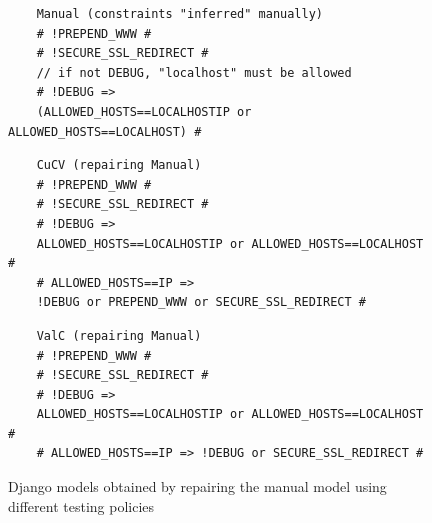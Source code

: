 \begin{tikzborder}{\cite{Gargantini16:validation}}
\begin{tikzborder}{\cite{gargantini_combinatorial_2017}}
\begin{tikzborder}{\cite{gargantini_combinatorial_2017}}
\begin{figure}[h]

	\vspace{-3mm}
	\begin{lstlisting}
	Manual (constraints "inferred" manually)
	# !PREPEND_WWW #
	# !SECURE_SSL_REDIRECT #
	// if not DEBUG, "localhost" must be allowed
	# !DEBUG => 
	(ALLOWED_HOSTS==LOCALHOSTIP or ALLOWED_HOSTS==LOCALHOST) #
	\end{lstlisting}
	\vspace{-3mm}\begin{lstlisting}
	CuCV (repairing Manual)
	# !PREPEND_WWW #
	# !SECURE_SSL_REDIRECT #
	# !DEBUG => 
	ALLOWED_HOSTS==LOCALHOSTIP or ALLOWED_HOSTS==LOCALHOST #
	# ALLOWED_HOSTS==IP => 
	!DEBUG or PREPEND_WWW or SECURE_SSL_REDIRECT #
	\end{lstlisting}
	\vspace{-3mm}\begin{lstlisting}
	ValC (repairing Manual)
	# !PREPEND_WWW #
	# !SECURE_SSL_REDIRECT #
	# !DEBUG => 
	ALLOWED_HOSTS==LOCALHOSTIP or ALLOWED_HOSTS==LOCALHOST #
	# ALLOWED_HOSTS==IP => !DEBUG or SECURE_SSL_REDIRECT #
	\end{lstlisting}
	\caption{Django models obtained by repairing the manual model using different testing policies}\label{fig:djangofaults}	
	

\end{figure}
\end{tikzborder}
\end{tikzborder}
\end{tikzborder}
